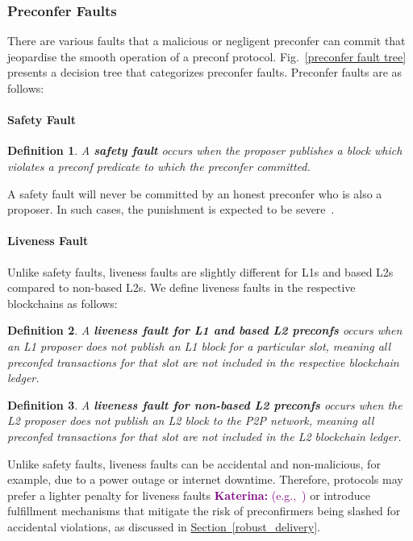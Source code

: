 \documentclass[a4paper]{article}
\theoremstyle{boldstyle}
\newtheorem{definitionx}{Definition}
\newenvironment{definition}
  {\begin{defopenboxq}\begin{definitionx}}
  {\end{definitionx}\end{defopenboxq}}
\newcommand{\cm}[1]{\textcolor{blue}{\textbf{Conor:} #1}}
\newcommand{\ks}[1]{\textcolor{purple}{\textbf{Katerina:} #1}}
\newcommand{\todoks}[1]{\todo[color=purple!40]{\textbf{Katerina:} #1}}
\begin{document}
    \subsubsection{Preconfer Faults} \label{preconfer_faults_and_punishing_conditions}
    There are various faults that a malicious or negligent preconfer can commit that jeopardise the smooth operation of a preconf protocol. Fig.~\ref{preconfer fault tree} presents a decision tree that categorizes preconfer faults. Preconfer faults are as follows:

    \paragraph{Safety Fault}
        \begin{definition}
            A \textbf{safety fault} occurs when the proposer publishes a block which violates a preconf predicate to which the preconfer committed.
        \end{definition}
        A safety fault will never be committed by an honest preconfer who is also a proposer. In such cases, the punishment is expected to be severe~\cite{W:Basedpreconfirmations}.
        
        
    \paragraph{Liveness Fault}

    \par
    Unlike safety faults, liveness faults are slightly different for L1s and based L2s compared to non-based L2s. We define liveness faults in the respective blockchains as follows:
    
        \begin{definition}
            A \textbf{liveness fault for L1 and based L2 preconfs} occurs when an L1 proposer does not publish an L1 block for a particular slot, meaning all preconfed transactions for that slot are not included in the respective blockchain ledger.
        \end{definition}
         \begin{definition}
            A \textbf{liveness fault for non-based L2 preconfs} occurs when the L2 proposer does not publish an L2 block to the P2P network, meaning all preconfed transactions for that slot are not included in the L2 blockchain ledger.  \end{definition}

        Unlike safety faults, liveness faults can be accidental and non-malicious, for example, due to a power outage or internet downtime. Therefore, protocols may prefer a lighter penalty for liveness faults \ks{(e.g.,~\cite{W:Basedpreconfirmations})} or introduce fulfillment mechanisms that mitigate the risk of preconfirmers being slashed for accidental violations, as discussed in \hyperref[robust_delivery]{Section~\ref{robust_delivery}}. \todoks{consistent internal mentions}      
\end{document}

